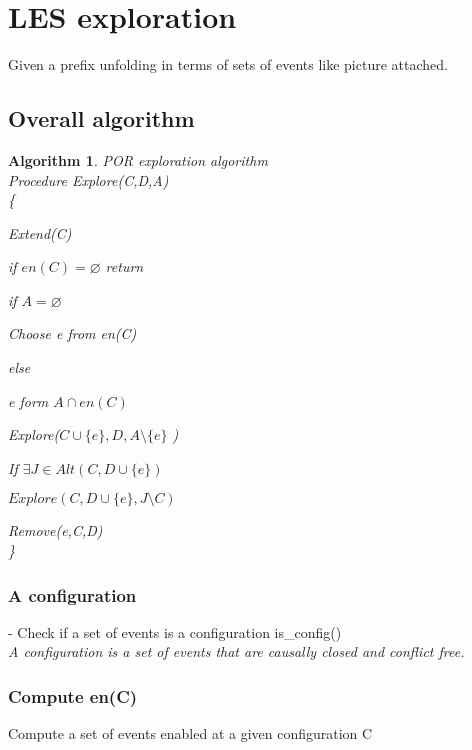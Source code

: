 \documentclass[11pt]{article}
\newtheorem{algorithm}{Algorithm}
\begin{document}
\section{LES exploration}

	Given a prefix unfolding in terms of sets of events like picture attached.

	\begin{figure}
	\end{figure}

	\subsection{Overall algorithm}
		\begin{algorithm}{POR exploration algorithm} \\
			\textup{Procedure Explore(C,D,A)} \\
			\{	
					
				\textup{Extend(C)}
				
				\let\emptyset\varnothing
				if $ en(C) = \emptyset $  return
				
				if $A=\emptyset$
		
					\textup{Choose e from en(C)}
				
				else
				
					 e form $A\cap en(C)$
					
				\textup{Explore($C\cup\{e\},D,A\setminus\{e\}$ )}
				
				If $\exists J \in Alt(C,D\cup\{e\})$
				
				$Explore(C,D\cup\{e\},J\setminus C)$
				
				\textup{Remove(e,C,D)}\\
			\}
			
		\end{algorithm}
		
	\subsubsection{A configuration}
		- Check if a set of events is a configuration is\_config()\\
		\textit{A configuration is a set of events that are causally closed and conflict free.}
		
		
		\subsubsection{Compute en(C)}
		Compute a set of events enabled at a given configuration C
\end{document}

